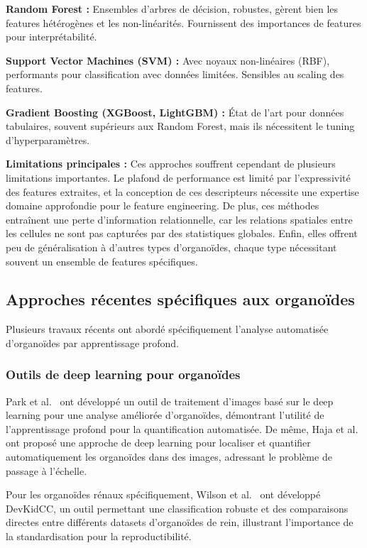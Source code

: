 \textbf{Random Forest :}
Ensembles d'arbres de décision, robustes, gèrent bien les features hétérogènes et les non-linéarités. Fournissent des importances de features pour interprétabilité.

\textbf{Support Vector Machines (SVM) :}
Avec noyaux non-linéaires (RBF), performants pour classification avec données limitées. Sensibles au scaling des features.

\textbf{Gradient Boosting (XGBoost, LightGBM) :}
État de l'art pour données tabulaires, souvent supérieurs aux Random Forest, mais ils nécessitent le tuning d'hyperparamètres.

\textbf{Limitations principales :}
Ces approches souffrent cependant de plusieurs limitations importantes. Le plafond de performance est limité par l'expressivité des features extraites, et la conception de ces descripteurs nécessite une expertise domaine approfondie pour le feature engineering. De plus, ces méthodes entraînent une perte d'information relationnelle, car les relations spatiales entre les cellules ne sont pas capturées par des statistiques globales. Enfin, elles offrent peu de généralisation à d'autres types d'organoïdes, chaque type nécessitant souvent un ensemble de features spécifiques.

\subsection{Approches récentes spécifiques aux organoïdes}

Plusieurs travaux récents ont abordé spécifiquement l'analyse automatisée d'organoïdes par apprentissage profond.

\subsubsection{Outils de deep learning pour organoïdes}

Park et al.~\cite{Park2023} ont développé un outil de traitement d'images basé sur le deep learning pour une analyse améliorée d'organoïdes, démontrant l'utilité de l'apprentissage profond pour la quantification automatisée. De même, Haja et al.~\cite{Haja2023} ont proposé une approche de deep learning pour localiser et quantifier automatiquement les organoïdes dans des images, adressant le problème de passage à l'échelle.

Pour les organoïdes rénaux spécifiquement, Wilson et al.~\cite{Wilson2022} ont développé DevKidCC, un outil permettant une classification robuste et des comparaisons directes entre différents datasets d'organoïdes de rein, illustrant l'importance de la standardisation pour la reproductibilité.

